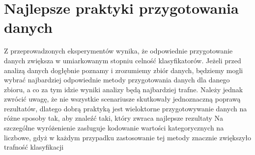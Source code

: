 \documentclass{book}
\begin{document}
\section{Najlepsze praktyki przygotowania danych}

Z przeprowadzonych eksperymentów wynika, 
że odpowiednie przygotowanie danych zwiększa w umiarkowanym stopniu celność 
klasyfikatorów. Jeżeli przed analizą danych dogłębnie poznamy i zrozumiemy zbiór danych,
będziemy mogli wybrać najbardziej odpowiednie metody przygotowania danych dla danego zbioru,
a co za tym idzie wyniki analizy będą najbardziej trafne.
Należy jednak zwrócić uwagę, że nie wszystkie 
scenariusze skutkowały jednoznaczną poprawą rezultatów, dlatego dobrą praktyką jest
wieloktorne przygotowywanie danych na różne sposoby tak, aby znaleźć taki, który zwraca najlepsze rezultaty 
Na szczególne wyróżenienie zasługuje kodowanie wartości 
kategorycznych na liczbowe, gdyż w każdym przypadku zastosowanie 
tej metody znacznie zwiększyło trafność klasyfikacji
\end{document}
